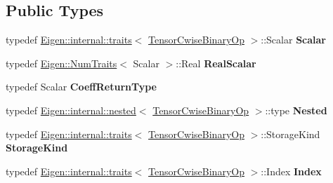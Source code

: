 \subsection*{Public Types}
\begin{DoxyCompactItemize}
\item 
\mbox{\label{class_eigen_1_1_tensor_cwise_binary_op_ab6feb8d00c245ae3633494dcbb4623de}} 
typedef \hyperlink{struct_eigen_1_1internal_1_1traits}{Eigen\+::internal\+::traits}$<$ \hyperlink{class_eigen_1_1_tensor_cwise_binary_op}{Tensor\+Cwise\+Binary\+Op} $>$\+::Scalar {\bfseries Scalar}
\item 
\mbox{\label{class_eigen_1_1_tensor_cwise_binary_op_aeb5ff517e3267f7009d2cef81cd700ec}} 
typedef \hyperlink{group___core___module_struct_eigen_1_1_num_traits}{Eigen\+::\+Num\+Traits}$<$ Scalar $>$\+::Real {\bfseries Real\+Scalar}
\item 
\mbox{\label{class_eigen_1_1_tensor_cwise_binary_op_a7440731924efdd5a6f24654004be74f1}} 
typedef Scalar {\bfseries Coeff\+Return\+Type}
\item 
\mbox{\label{class_eigen_1_1_tensor_cwise_binary_op_a9226f2d49617be16f19110581407fdd3}} 
typedef \hyperlink{struct_eigen_1_1internal_1_1nested}{Eigen\+::internal\+::nested}$<$ \hyperlink{class_eigen_1_1_tensor_cwise_binary_op}{Tensor\+Cwise\+Binary\+Op} $>$\+::type {\bfseries Nested}
\item 
\mbox{\label{class_eigen_1_1_tensor_cwise_binary_op_ac7da83ffbf17a0e1e5d9582707768962}} 
typedef \hyperlink{struct_eigen_1_1internal_1_1traits}{Eigen\+::internal\+::traits}$<$ \hyperlink{class_eigen_1_1_tensor_cwise_binary_op}{Tensor\+Cwise\+Binary\+Op} $>$\+::Storage\+Kind {\bfseries Storage\+Kind}
\item 
\mbox{\label{class_eigen_1_1_tensor_cwise_binary_op_a06da4fbdebb9959b639ba763e887706d}} 
typedef \hyperlink{struct_eigen_1_1internal_1_1traits}{Eigen\+::internal\+::traits}$<$ \hyperlink{class_eigen_1_1_tensor_cwise_binary_op}{Tensor\+Cwise\+Binary\+Op} $>$\+::Index {\bfseries Index}
\item 

\end{DoxyCompactItemize}
